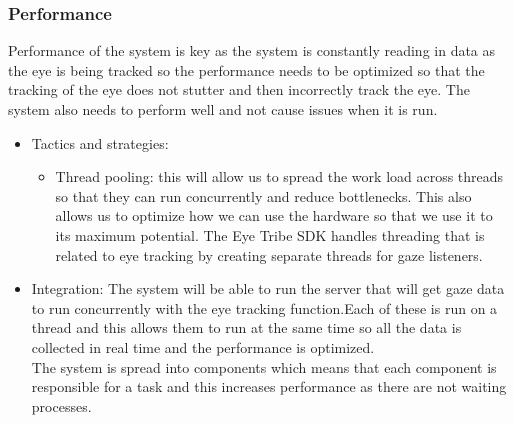 \subsubsection{Performance}
\begin{flushleft}
Performance of the system is key as the system is constantly reading in data as the eye is being tracked so the performance needs to be optimized so that the tracking of the eye does not stutter and then incorrectly track the eye. The system also needs to perform well and not cause issues when it is run.
\begin{itemize}
\item{Tactics and strategies}:
\begin{itemize}
\item{Thread pooling}: this will allow us to spread the work load across threads so that they can run concurrently and reduce bottlenecks. This also allows us to optimize how we can use the hardware so that we use it to its maximum potential. The Eye Tribe SDK handles threading that is related to eye tracking by creating separate threads for gaze listeners.
\end{itemize}

\item{Integration}: The system will be able to run the server that will get gaze data to run concurrently with the eye tracking function.Each of these is run on a thread and this allows them to run at the same time so all the data is collected in real time and the performance is optimized.\\
The system is spread into components which means that each component is responsible for a task and this increases performance as there are not waiting processes.
\end{itemize}

\end{flushleft}
		
